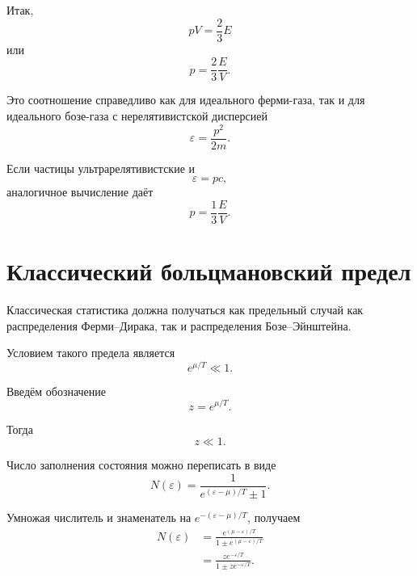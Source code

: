 \documentclass[../final.tex]{subfiles}
\begin{document}
Итак,
%
\[
    \boxed{
        pV
        =
        \frac{2}{3}E
    }
\]
%
или
%
\[
    \boxed{
        p
        =
        \frac{2}{3}
        \frac{E}{V}
    }.
\]

Это соотношение справедливо как для идеального ферми-газа,
так и для идеального бозе-газа с нерелятивистской дисперсией
%
\begin{equation*}
    \varepsilon
    =
    \frac{p^2}{2m}.
\end{equation*}

Если частицы ультрарелятивистские и
%
\begin{equation*}
    \varepsilon
    =
    pc,
\end{equation*}
%
аналогичное вычисление даёт
%
\[
    \boxed{
        p
        =
        \frac{1}{3}
        \frac{E}{V}
    }.
\]


\section{Классический больцмановский предел}

Классическая статистика должна получаться как предельный случай
как распределения Ферми--Дирака, так и распределения Бозе--Эйнштейна.

Условием такого предела является
%
\[
    \boxed{
        e^{\mu/T}
        \ll
        1
    }.
\]

Введём обозначение
%
\begin{equation*}
    z
    =
    e^{\mu/T}.
\end{equation*}

Тогда
%
\begin{equation*}
    z
    \ll
    1.
\end{equation*}

Число заполнения состояния можно переписать в виде
%
\begin{equation*}
    N(\varepsilon)
    =
    \frac{1}{
        e^{(\varepsilon-\mu)/T}\pm1
    }.
\end{equation*}

Умножая числитель и знаменатель на
$e^{-(\varepsilon-\mu)/T}$, получаем
%
\begin{align*}
    N(\varepsilon)
    &=
    \frac{
        e^{(\mu-\varepsilon)/T}
    }{
        1
        \pm
        e^{(\mu-\varepsilon)/T}
    }
    \\[4pt]
    &=
    \frac{
        ze^{-\varepsilon/T}
    }{
        1
        \pm
        ze^{-\varepsilon/T}
    }.
\end{align*}
\end{document}
